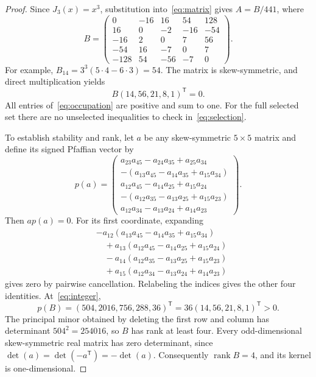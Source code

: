 \documentclass[11pt]{article}
\begin{document}
\begin{proof}
Since $J_3(x)=x^3$, substitution into~\eqref{eq:matrix} gives
$A=B/441$, where
\begin{equation}\label{eq:integer}
 B=\begin{pmatrix}
 0&-16&16&54&128\\
 16&0&-2&-16&-54\\
 -16&2&0&7&56\\
 -54&16&-7&0&7\\
 -128&54&-56&-7&0
 \end{pmatrix}.
\end{equation}
For example, $B_{14}=3^3(5\cdot4-6\cdot3)=54$.
The matrix is skew-symmetric, and direct multiplication yields
\begin{equation}\label{eq:finite}
 B(14,56,21,8,1)^{\mathsf T}=0.
\end{equation}
All entries of~\eqref{eq:occupation} are positive and sum to one.
For the full selected set there are no unselected inequalities
to check in~\eqref{eq:selection}.

To establish stability and rank, let $a$ be any skew-symmetric
$5\times5$ matrix and define its signed Pfaffian vector by
\begin{equation}\label{eq:pfaffian}
 p(a)=\begin{pmatrix}
 a_{23}a_{45}-a_{24}a_{35}+a_{25}a_{34}\\
 -(a_{13}a_{45}-a_{14}a_{35}+a_{15}a_{34})\\
 a_{12}a_{45}-a_{14}a_{25}+a_{15}a_{24}\\
 -(a_{12}a_{35}-a_{13}a_{25}+a_{15}a_{23})\\
 a_{12}a_{34}-a_{13}a_{24}+a_{14}a_{23}
 \end{pmatrix}.
\end{equation}
Then $ap(a)=0$. For its first coordinate, expanding
\begin{align*}
 &-a_{12}(a_{13}a_{45}-a_{14}a_{35}+a_{15}a_{34})\\
 &\quad+a_{13}(a_{12}a_{45}-a_{14}a_{25}+a_{15}a_{24})\\
 &\quad-a_{14}(a_{12}a_{35}-a_{13}a_{25}+a_{15}a_{23})\\
 &\quad+a_{15}(a_{12}a_{34}-a_{13}a_{24}+a_{14}a_{23})
 \end{align*}
gives zero by pairwise cancellation. Relabeling the indices
gives the other four identities. At~\eqref{eq:integer},
\begin{equation}\label{eq:pvalue}
 p(B)=(504,2016,756,288,36)^{\mathsf T}
     =36(14,56,21,8,1)^{\mathsf T}>0.
\end{equation}
The principal minor obtained by deleting the first row and
column has determinant $504^2=254016$, so $B$ has rank at
least four. Every odd-dimensional skew-symmetric real matrix
has zero determinant, since $\det(a)=\det(-a^{\mathsf T})=-\det(a)$.
Consequently $\operatorname{rank}B=4$, and its kernel is one-dimensional.


\end{proof}
\end{document}
